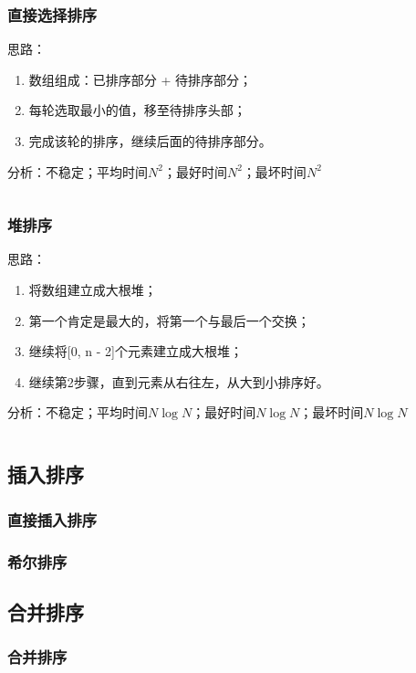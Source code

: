 \documentclass{article}
\begin{document}
    \subsubsection{直接选择排序}
    思路：
    \begin{enumerate}
      \item 数组组成：已排序部分 + 待排序部分；
      \item 每轮选取最小的值，移至待排序头部；
      \item 完成该轮的排序，继续后面的待排序部分。
    \end{enumerate}
    分析：不稳定；平均时间$N^2$；最好时间$N^2$；最坏时间$N^2$

    \inputminted{java}{src/chapter02/SelectionSort.java}

    \subsubsection{堆排序}
    思路：
    \begin{enumerate}
      \item 将数组建立成大根堆；
      \item 第一个肯定是最大的，将第一个与最后一个交换；
      \item 继续将[0, n - 2]个元素建立成大根堆；
      \item 继续第2步骤，直到元素从右往左，从大到小排序好。
    \end{enumerate}
    分析：不稳定；平均时间$N \log N$；最好时间$N \log N$；最坏时间$N \log N$

    \inputminted{java}{src/chapter02/HeapSort.java}

  \subsection{插入排序}
    \subsubsection{直接插入排序}
    \subsubsection{希尔排序}
  \subsection{合并排序}
    \subsubsection{合并排序}
\end{document}
